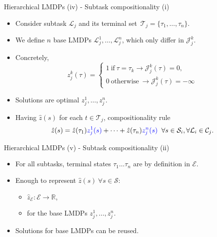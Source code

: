 \documentclass{beamer}
\theoremstyle{mystyle}
\newcommand{\cC}{\mathcal{C}}
\newcommand{\cE}{\mathcal{E}}
\newcommand{\cJ}{\mathcal{J}}
\newcommand{\cL}{\mathcal{L}}
\newcommand{\cS}{\mathcal{S}}
\newcommand{\cT}{\mathcal{T}}
\begin{document}
\begin{frame}{Hierarchical LMDPs (iv) - Subtask compositionality (i)}

\begin{itemize}
    \item Consider subtask $\cL_j$ and its terminal set~$\cT_j=\{\tau_1,\ldots,\tau_n\}$.
    \item We define {\color{blue} $n$ base LMDPs $\cL_j^1,\ldots,\cL_j^n$}, which only differ in $\cJ_j^k$.
    \item Concretely, 
    \[ 
        z_j^k(\tau)=\begin{cases}
            1 \ \text{if} \ \tau=\tau_k \rightarrow \cJ_j^k(\tau)=0,\\
            0 \ \text{otherwise} \ \rightarrow \cJ_j^k(\tau)=-\infty
        \end{cases}
    \]
    \item Solutions are {\color{blue} optimal $z_j^1,\ldots,z_j^n$.}
    \item Having $\hat z(s)$ for each $t \in \cT_j$, {\color{blue}compositionality rule}
    \begin{equation*}
        \hat{z}(s)=\hat{z}(\tau_1){\color{blue} z_j^1(s)}+\cdots+\hat{z}(\tau_n){\color{blue} z_j^n(s)} \;\; \forall s\in\cS_i,\forall\cL_i\in\cC_j.
    \end{equation*}
\end{itemize}

    
\end{frame}


\begin{frame}{Hierarchical LMDPs (v) - Subtask compositionality (ii)}


\begin{itemize}

    
   \item For all subtasks, terminal states $\tau_1 \dots \tau_n$ are by definition in $\cE$.
   \item Enough to represent $\hat z(s) \ \forall s \in \cS$:
        \begin{itemize}
            \item $\hat{z}_\cE:\cE\rightarrow\mathbb{R}$, 
            \item for the base LMDPs {\color{blue} $z_j^1,\ldots,z_j^n$}.
        \end{itemize}
   \item Solutions for base LMDPs {\color{blue} can be reused}. 
    
\end{itemize}

\end{frame}
\end{document}
